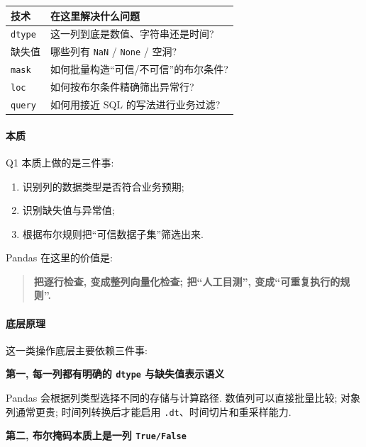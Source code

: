 \documentclass[11pt]{article}
\providecommand{\tightlist}{%
      \setlength{\itemsep}{0pt}\setlength{\parskip}{0pt}}
\begin{document}
    {\def\LTcaptype{none} %
\begin{longtable}[]{@{}ll@{}}
\toprule\noalign{}
技术 & 在这里解决什么问题 \\
\midrule\noalign{}
\endhead
\bottomrule\noalign{}
\endlastfoot
\texttt{dtype} & 这一列到底是数值、字符串还是时间? \\
缺失值 & 哪些列有 \texttt{NaN} / \texttt{None} / 空洞? \\
\texttt{mask} & 如何批量构造``可信/不可信''的布尔条件? \\
\texttt{loc} & 如何按布尔条件精确筛出异常行? \\
\texttt{query} & 如何用接近 SQL 的写法进行业务过滤? \\
\end{longtable}
}

    \paragraph{本质}\label{ux672cux8d28}

    Q1 本质上做的是三件事:

\begin{enumerate}
\def\labelenumi{\arabic{enumi}.}
\tightlist
\item
  识别列的数据类型是否符合业务预期;
\item
  识别缺失值与异常值;
\item
  根据布尔规则把``可信数据子集''筛选出来.
\end{enumerate}

Pandas 在这里的价值是:

\begin{quote}
\textbf{把逐行检查, 变成整列向量化检查; 把``人工目测'',
变成``可重复执行的规则''.}
\end{quote}

    \paragraph{底层原理}\label{ux5e95ux5c42ux539fux7406}

    这一类操作底层主要依赖三件事:

\textbf{第一, 每一列都有明确的 \texttt{dtype} 与缺失值表示语义}

Pandas 会根据列类型选择不同的存储与计算路径. 数值列可以直接批量比较;
对象列通常更贵; 时间列转换后才能启用 \texttt{.dt}、时间切片和重采样能力.

\textbf{第二, 布尔掩码本质上是一列 \texttt{True/False}}
\end{document}
